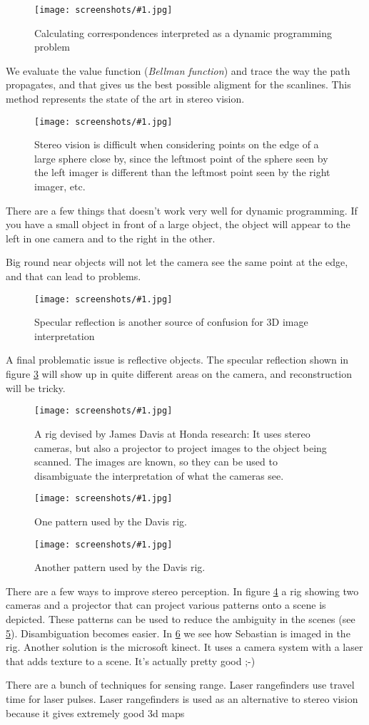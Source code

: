 \documentclass[a4, 12pt, english, USenglish]{scrreprt}
\newcommand{\screenshot}[2]{
\begin{figure}[htb]
\texttt{[image: screenshots/\#1.jpg]}
\label{#1}
\caption{#2}
\end{figure}}
\newcommand{\idx}[1]{{\em #1}\index{#1}}
\begin{document}
\screenshot{dynamicscanline}{Calculating correspondences interpreted
  as a dynamic programming problem}

We evaluate the value function (\idx{Bellman function}) and trace the way
the path propagates, and that gives us the best possible aligment for
the scanlines.  This method represents the state of the art in stereo
vision.


\screenshot{stereoproblems}{Stereo vision is difficult when
  considering points on the edge of a large sphere close by, since the
leftmost point of the sphere seen by the left imager is different than
the leftmost point seen by the right imager, etc.}

There are a few things that doesn't work very well for dynamic
programming.  If you have a small object in front of a large object,
the object will appear to the left in one camera and to the right in
the other.   

Big round near objects will not let the camera see the same point at
the edge, and that can lead to problems.

\screenshot{specularreflection}{Specular reflection is another source
  of confusion for 3D image interpretation}


A final problematic issue is reflective objects.   The specular
reflection shown in figure \ref{specularreflection} will show up in
quite different areas on the camera, and reconstruction will be tricky.

\screenshot{davisrig}{A rig devised by James Davis at Honda research: It uses stereo cameras,
  but also a projector to project images to the object being scanned.
The images are known, so they can be used to disambiguate the
interpretation of what the cameras see.}
\screenshot{davispattern2}{One pattern used by the Davis rig.}
\screenshot{davispattern3}{Another pattern used by the Davis rig.}

There are a few ways to improve stereo perception.  In figure
\ref{davisrig} a rig showing two cameras and a projector that can
project various patterns onto a scene is depicted.  These patterns can
be used to reduce the ambiguity in the scenes (see
\ref{davispattern2}).  Disambiguation becomes easier. In
\ref{davispattern3} we see how Sebastian is imaged in the rig.
Another solution is the microsoft kinect.  It uses a camera system
with a laser that adds texture to a scene.  It's actually pretty good ;-)

There are a bunch of techniques for sensing range.  Laser rangefinders
use travel time for laser pulses.   Laser rangefinders is used as an
alternative to stereo vision because it gives extremely good 3d maps
\end{document}
